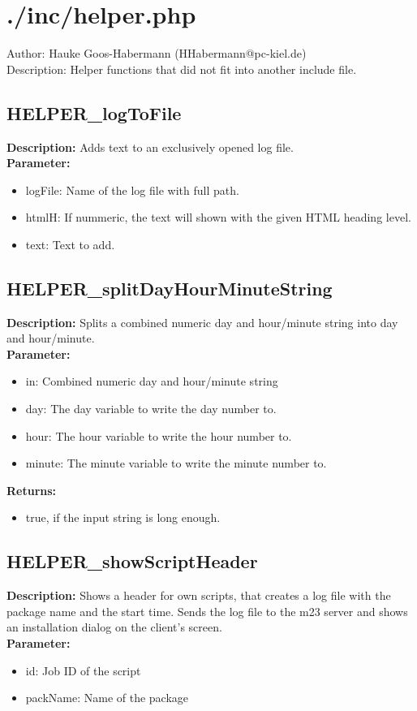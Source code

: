 \newpage\section{./inc/helper.php}
 Author: Hauke Goos-Habermann (HHabermann@pc-kiel.de)\\
 Description: Helper functions that did not fit into another include file.\\

\subsection{HELPER\_logToFile}
\textbf{Description:} Adds text to an exclusively opened log file.\\
\textbf{Parameter:}
\begin{itemize}
\item logFile: Name of the log file with full path.
\item htmlH: If nummeric, the text will shown with the given HTML heading level.
\item text: Text to add.
\end{itemize}

\subsection{HELPER\_splitDayHourMinuteString}
\textbf{Description:} Splits a combined numeric day and hour/minute string into day and hour/minute.\\
\textbf{Parameter:}
\begin{itemize}
\item in: Combined numeric day and hour/minute string
\item day: The day variable to write the day number to.
\item hour: The hour variable to write the hour number to.
\item minute: The minute variable to write the minute number to.
\end{itemize}
\textbf{Returns:}
\begin{itemize}
\item true, if the input string is long enough.
\end{itemize}

\subsection{HELPER\_showScriptHeader}
\textbf{Description:} Shows a header for own scripts, that creates a log file with the package name and the start time. Sends the log file to the m23 server and shows an installation dialog on the client's screen.\\
\textbf{Parameter:}
\begin{itemize}
\item id: Job ID of the script
\item packName: Name of the package
\end{itemize}

